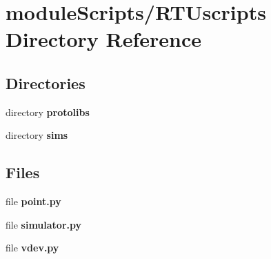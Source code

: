 \section{module\+Scripts/\+R\+T\+Uscripts Directory Reference}
\label{dir_e17229dbb96b03cabc1b39ba12eaae49}
\subsection*{Directories}
\begin{DoxyCompactItemize}
\item 
directory {\bf protolibs}
\item 
directory {\bf sims}
\end{DoxyCompactItemize}
\subsection*{Files}
\begin{DoxyCompactItemize}
\item 
file {\bf point.\+py}
\item 
file {\bf simulator.\+py}
\item 
file {\bf vdev.\+py}
\end{DoxyCompactItemize}
